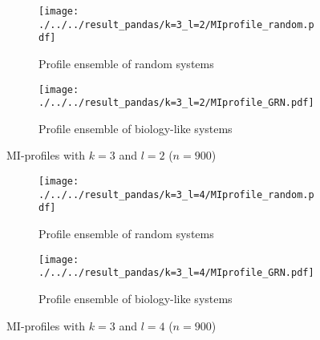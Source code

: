 \documentclass[../main.tex]{subfiles}
\begin{document}
\begin{figure}[H]
    \centering
    \begin{subfigure}[b]{0.4\textwidth}
        \texttt{[image: ./../../result\_pandas/k=3\_l=2/MIprofile\_random.pdf]}
        \caption{Profile ensemble of random systems}
    \end{subfigure}
    \begin{subfigure}[b]{0.4\textwidth}
        \texttt{[image: ./../../result\_pandas/k=3\_l=2/MIprofile\_GRN.pdf]}
        \caption{Profile ensemble of biology-like systems}
    \end{subfigure}
    \caption{MI-profiles with $k=3$ and $l=2$ ($n=900$)}
    \label{fig:profilel2}
\end{figure}

\begin{figure}[H]
    \centering
    \begin{subfigure}[b]{0.4\textwidth}
        \texttt{[image: ./../../result\_pandas/k=3\_l=4/MIprofile\_random.pdf]}
        \caption{Profile ensemble of random systems}
    \end{subfigure}
    \begin{subfigure}[b]{0.4\textwidth}
        \texttt{[image: ./../../result\_pandas/k=3\_l=4/MIprofile\_GRN.pdf]}
        \caption{Profile ensemble of biology-like systems}
    \end{subfigure}
    \caption{MI-profiles with $k=3$ and $l=4$ ($n=900$)}
    \label{fig:profilel4}
\end{figure}


\end{document}
